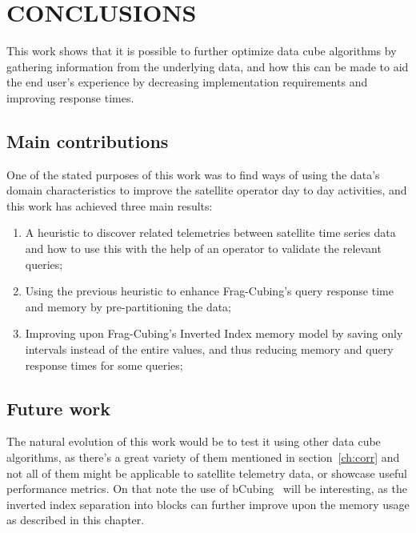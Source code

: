 
\chapter{CONCLUSIONS}\label{ch:concl}

This work shows that it is possible to further optimize data cube algorithms by gathering information from the underlying data, and how this can be made to aid the end user's experience by decreasing implementation requirements and improving response times.

\section{Main contributions}\label{ch:concl:contrib}

One of the stated purposes of this work was to find ways of using the data's domain characteristics to improve the satellite operator day to day activities, and this work has achieved three main results:

\begin{enumerate}
\item A heuristic to discover related telemetries between satellite time series data and how to use this with the help of an operator to validate the relevant queries;
\item Using the previous heuristic to enhance Frag-Cubing's query response time and memory by pre-partitioning the data;
\item Improving upon Frag-Cubing's Inverted Index memory model by saving only intervals instead of the entire values, and thus reducing memory and query response times for some queries;
\end{enumerate}


\section{Future work}\label{ch:concl:future}

The natural evolution of this work would be to test it using other data cube algorithms, as there's a great variety of them mentioned in section~\ref{ch:corr} and not all of them might be applicable to satellite telemetry data, or showcase useful performance metrics.
On that note the use of bCubing~\cite{silva:2015:abordagensParaCubo} will be interesting, as the inverted index separation into blocks can further improve upon the memory usage as described in this chapter.

